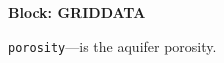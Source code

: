 
\item \textbf{Block: GRIDDATA}

\begin{description}
\item \texttt{porosity}---is the aquifer porosity.

\end{description}

